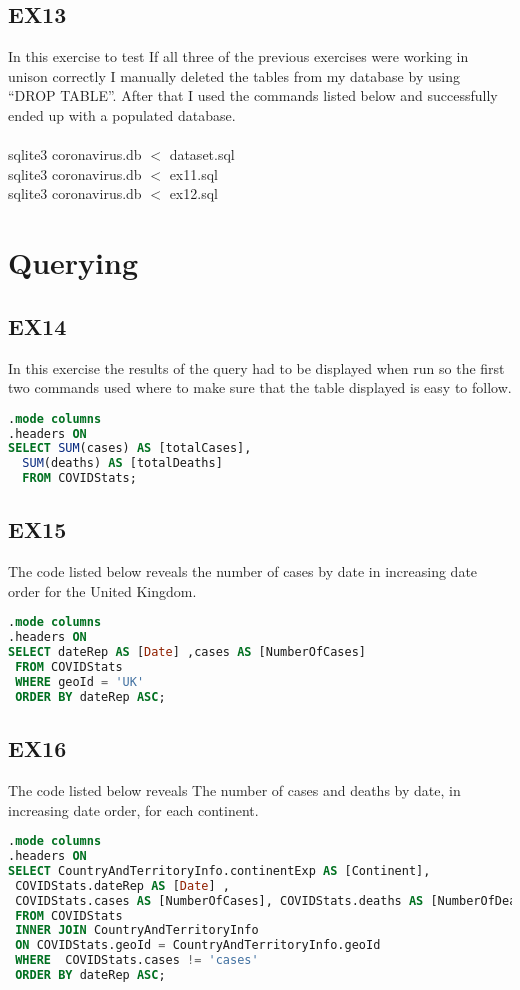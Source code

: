 \documentclass{report}
\begin{document}
\subsection{EX13}
In this exercise to test If all three of the previous exercises were working in unison correctly I manually deleted the tables from my database by using “DROP TABLE”. After that I used the commands listed below and successfully ended up with a populated database.\\ \\
sqlite3 coronavirus.db $<$ dataset.sql\\
sqlite3 coronavirus.db $<$ ex11.sql\\
sqlite3 coronavirus.db $<$ ex12.sql

\section{Querying}
\subsection{EX14}
In this exercise the results of the query had to be displayed when run so the first two commands used where to make sure that the table displayed is easy to follow.
\begin{lstlisting}[language=SQL]
.mode columns
.headers ON
SELECT SUM(cases) AS [totalCases],
  SUM(deaths) AS [totalDeaths]
  FROM COVIDStats;
\end{lstlisting}

\subsection{EX15}
The code listed below reveals the number of cases by date in increasing date order for the United Kingdom.
\begin{lstlisting}[language=SQL]
.mode columns
.headers ON
SELECT dateRep AS [Date] ,cases AS [NumberOfCases]
 FROM COVIDStats
 WHERE geoId = 'UK'
 ORDER BY dateRep ASC;
\end{lstlisting}

\subsection{EX16}
The code listed below reveals  The number of cases and deaths by date, in increasing date order, for each continent.
\begin{lstlisting}[language=SQL]
.mode columns
.headers ON
SELECT CountryAndTerritoryInfo.continentExp AS [Continent],
 COVIDStats.dateRep AS [Date] ,
 COVIDStats.cases AS [NumberOfCases], COVIDStats.deaths AS [NumberOfDeaths]
 FROM COVIDStats
 INNER JOIN CountryAndTerritoryInfo 
 ON COVIDStats.geoId = CountryAndTerritoryInfo.geoId
 WHERE  COVIDStats.cases != 'cases'
 ORDER BY dateRep ASC;
\end{lstlisting}
\end{document}
